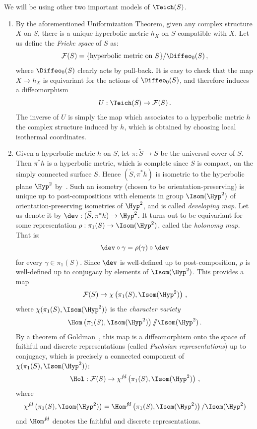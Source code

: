 We will be using other two important models of $\Teich(S)$.
\begin{enumerate}
\item By the aforementioned Uniformization Theorem, given any complex structure $X$ on $S$, there is a unique hyperbolic metric $h_X$ on $S$ compatible with $X$. Let us define the \emph{Fricke space} of $S$ as:
\[
\mathcal F(S)=\{\text{hyperbolic metric on }S\}/\Diffeo_0(S)\,,
\]
where $\Diffeo_0(S)$ clearly acts by pull-back. It is easy to check that the map $X\to h_X$ is equivariant for the actions of $\Diffeo_0(S)$, and therefore induces a diffeomorphism
\begin{equation}
U:\Teich(S)\to\mathcal F(S)\,.
\end{equation}
The inverse of $U$ is simply the map which associates to a hyperbolic metric $h$ the complex structure induced by $h$, which is obtained by choosing local isothermal coordinates.
\item Given a hyperbolic metric $h$ on $S$, let $\pi:\widetilde S\to S$ be the universal cover of $S$. Then $\pi^*h$ is a hyperbolic metric, which is complete since $S$ is compact, on the simply connected surface $S$. Hence $(\widetilde S,\pi^*h)$ is isometric to the hyperbolic plane $\Hyp^2$ by~\cite[Theorem~8.6.2]{opac-b1124711}. Such an isometry (chosen to be orientation-preserving) is unique up to post-compositions with elements in group $\Isom(\Hyp^2)$ of orientation-preserving isometries of $\Hyp^2$, and is called \emph{developing map}. Let us denote it by $\dev:(\widetilde S,\pi^*h)\to\Hyp^2$. It turns out to be equivariant for some representation $\rho:\pi_1(S)\to\Isom(\Hyp^2)$, called the \emph{holonomy map}. That is:
\[
\dev\circ\gamma=\rho(\gamma)\circ\dev
\]
for every $\gamma\in\pi_1(S)$. Since $\dev$ is well-defined up to post-composition, $\rho$ is well-defined up to conjugacy by elements of $\Isom(\Hyp^2)$. This provides a map
\[
\mathcal F(S)\to \chi\left(\pi_1(S),\Isom(\Hyp^2)\right)\,,
\]
where $\chi(\pi_1(S),\Isom(\Hyp^2))$ is the \emph{character variety}
\[
\Hom\left(\pi_1(S),\Isom(\Hyp^2)\right)/\!\!/\Isom(\Hyp^2)\,.
\]
By a theorem of Goldman~\cite{goldmanthesis}, this map is a diffeomorphism onto the space of faithful and discrete representations (called \emph{Fuchsian representations}) up to conjugacy, which is precisely a connected component of $\chi(\pi_1(S),\Isom(\Hyp^2))$:
\begin{equation}
\Hol:\mathcal F(S)\to \chi^{f\!d}\left(\pi_1(S),\Isom(\Hyp^2)\right)\,,
\end{equation}
where
\[
\chi^{f\!d}\left(\pi_1(S),\Isom(\Hyp^2)\right)=\Hom^{f\!d}\left(\pi_1(S),\Isom(\Hyp^2)\right)/\Isom(\Hyp^2)
\]
and $\Hom^{f\!d}$ denotes the faithful and discrete representations.
\end{enumerate}



